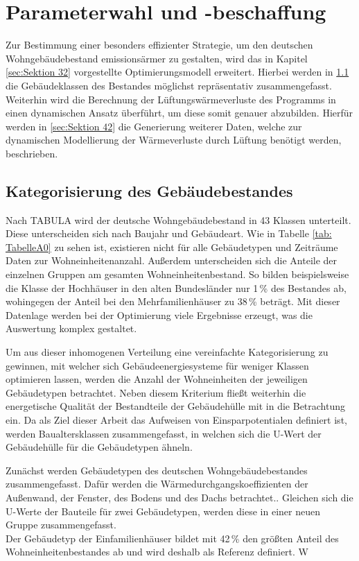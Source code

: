 \chapter{Parameterwahl und -beschaffung}

Zur Bestimmung einer besonders effizienter Strategie, um den deutschen Wohngebäudebestand emissionsärmer zu gestalten, wird das in Kapitel \ref{sec:Sektion 32} vorgestellte Optimierungsmodell erweitert.
Hierbei werden in \ref{sec:Sektion 41} die Gebäudeklassen des Bestandes möglichst repräsentativ zusammengefasst.
Weiterhin wird die Berechnung der Lüftungswärmeverluste des Programms in einen dynamischen Ansatz überführt, um diese somit genauer abzubilden.
Hierfür werden in \ref{sec:Sektion 42} die Generierung weiterer Daten, welche zur dynamischen Modellierung der Wärmeverluste durch Lüftung benötigt werden, beschrieben.

\section{Kategorisierung des Gebäudebestandes}
\label{sec:Sektion 41}

Nach TABULA wird der deutsche Wohngebäudebestand in 43 Klassen unterteilt.
Diese unterscheiden sich nach Baujahr und Gebäudeart.
Wie in Tabelle \ref{tab: TabelleA0} zu sehen ist, existieren nicht für alle Gebäudetypen und Zeiträume Daten zur Wohneinheitenanzahl.
Außerdem unterscheiden sich die Anteile der einzelnen Gruppen am gesamten Wohneinheitenbestand.
So bilden beispielsweise die Klasse der Hochhäuser in den alten Bundesländer nur 1\,\% des Bestandes ab, wohingegen der Anteil bei den Mehrfamilienhäuser zu 38\,\% beträgt.
Mit dieser Datenlage werden bei der Optimierung viele Ergebnisse erzeugt, was die Auswertung komplex gestaltet.

Um aus dieser inhomogenen Verteilung eine vereinfachte Kategorisierung zu gewinnen, mit welcher sich Gebäudeenergiesysteme für weniger Klassen optimieren lassen, werden die Anzahl der Wohneinheiten der jeweiligen Gebäudetypen betrachtet.
Neben diesem Kriterium fließt weiterhin die energetische Qualität der Bestandteile der Gebäudehülle mit in die Betrachtung ein.
Da als Ziel dieser Arbeit das Aufweisen von Einsparpotentialen definiert ist, werden Baualtersklassen zusammengefasst, in welchen sich die U-Wert der Gebäudehülle für die Gebäudetypen ähneln.

Zunächst werden Gebäudetypen des deutschen Wohngebäudebestandes zusammengefasst.
Dafür werden die Wärmedurchgangskoeffizienten der Außenwand, der Fenster, des Bodens und des Dachs betrachtet..
Gleichen sich die U-Werte der Bauteile für zwei Gebäudetypen, werden diese in einer neuen Gruppe zusammengefasst.\\
Der Gebäudetyp der Einfamilienhäuser bildet mit 42\,\% den größten Anteil des Wohneinheitenbestandes ab und wird deshalb als Referenz definiert.
W














